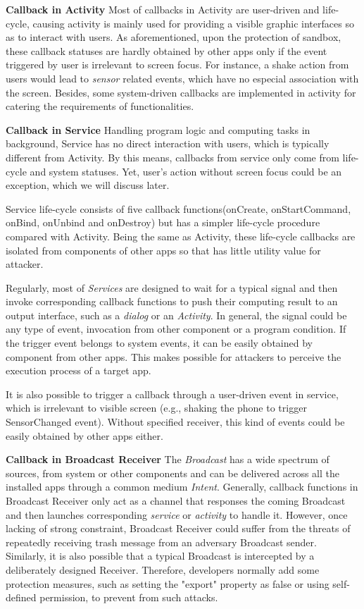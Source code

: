 \documentclass{sig-alternate-05-2015}
\begin{document}
\textbf{Callback in Activity} 
Most of callbacks in Activity are user-driven and life-cycle, causing activity is mainly used for providing a visible graphic interfaces so as to interact with users. As aforementioned, upon the protection of sandbox, these callback statuses are hardly obtained by other apps only if the event triggered by user is irrelevant to screen focus. For instance, a shake action from users would lead to \textit{sensor} related events, which have no especial association with the screen. Besides, some system-driven callbacks are implemented in activity for catering the requirements of functionalities. 

\textbf{Callback in Service} 
Handling program logic and computing tasks in background, Service has no direct interaction with users, which is typically different from Activity. By this means, callbacks from service only come from life-cycle and system statuses. Yet, user's action without screen focus could be an exception, which we will discuss later.

Service life-cycle consists of five callback functions(onCreate, onStartCommand, onBind, onUnbind and onDestroy) but has a simpler life-cycle procedure compared with Activity. Being the same as Activity, these life-cycle callbacks are isolated from components of other apps so that has little utility value for attacker. 

Regularly, most of \textit{Services} are designed to wait for a typical signal and then invoke corresponding callback functions to push their computing result to an output interface, such as a \textit{dialog} or an \textit{Activity}. In general, the signal could be any type of event, invocation from other component or a program condition. If the trigger event belongs to system events, it can be easily obtained by component from other apps. This makes possible for attackers to perceive the execution process of a target app.

It is also possible to trigger a callback through a user-driven event in service, which is irrelevant to visible screen (e.g., shaking the phone to trigger SensorChanged event). Without specified receiver, this kind of events could be easily obtained by other apps either.   

\textbf{Callback in Broadcast Receiver} 
The \textit{Broadcast} has a wide spectrum of sources, from system or other components and can be delivered across all the installed apps through a common medium \textit{Intent}. Generally, callback functions in Broadcast Receiver only act as a channel that responses the coming Broadcast and then launches corresponding \textit{service} or \textit{activity} to handle it. However, once lacking of strong constraint, Broadcast Receiver could suffer from the threats of repeatedly receiving trash message from an adversary Broadcast sender. Similarly, it is also possible that a typical Broadcast is intercepted by a deliberately designed Receiver. Therefore, developers normally add some protection measures, such as setting the "export" property as false or using self-defined permission, to prevent from such attacks.
\end{document}
